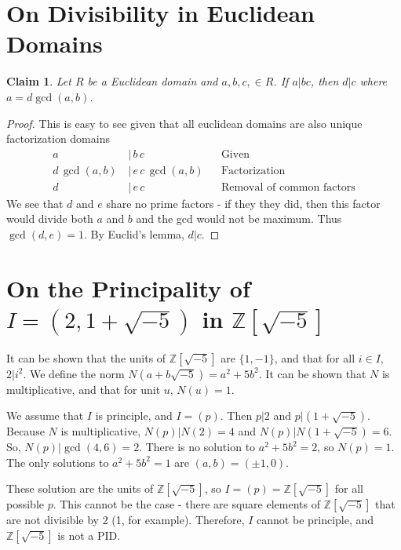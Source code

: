 \documentclass[12pt]{article}
\newtheorem*{claim*}{Claim}
\newcommand*{\Z}{\mathbb{Z}}
\begin{document}
\section{On Divisibility in Euclidean Domains}
\begin{claim*}
Let $R$ be a Euclidean domain and $a, b, c, \in R$. If $a|bc$, then $d|c$ where $a = d \gcd(a, b)$.
\end{claim*}
\begin{proof}
This is easy to see given that all euclidean domains are also unique factorization domains
\begin{align*}
a \, &| \, b \, c & & \text{Given}\\
d \, \gcd(a, b) \, &| \, e \, c \, \gcd(a, b) & & \text{Factorization}\\
d \, &| \, e \, c & & \text{Removal of common factors}
\end{align*}
\noindent We see that $d$ and $e$ share no prime factors - if they they did, then this factor would divide both $a$ and $b$ and the gcd would not be maximum. Thus $\gcd(d, e) = 1$. By Euclid's lemma, $d | c$.
\end{proof}

\section{On the Principality of $I = (2, 1 + \sqrt{-5})$ in $\Z[\sqrt{-5}]$}
It can be shown that the units of $\Z[\sqrt{-5}]$ are $\{1, -1\}$, and that for all $i \in I$, $2 | i^2$. We define the norm $N(a + b \sqrt{-5}) = a^2 + 5b^2$. It can be shown that $N$ is multiplicative, and that for unit $u$, $N(u) = 1$. 

We assume that $I$ is principle, and $I = (p)$. Then $p | 2$ and $p | (1 + \sqrt{-5})$. Because $N$ is multiplicative, $N(p) | N(2) = 4$ and $N(p) | N(1 + \sqrt{-5}) = 6$. So, $N(p) | \gcd(4, 6) = 2$. There is no solution to $a^2 + 5b^2 = 2$, so $N(p) = 1$. The only solutions to $a^2 + 5b^2 = 1$ are $(a, b) = (\pm 1, 0)$.

These solution are the units of $\Z[\sqrt{-5}]$, so $I = (p) = \Z[\sqrt{-5}]$ for all possible $p$. This cannot be the case - there are square elements of $\Z[\sqrt{-5}]$ that are not divisible by 2 (1, for example). Therefore, $I$ cannot be principle, and $\Z[\sqrt{-5}]$ is not a PID.
\end{document}
